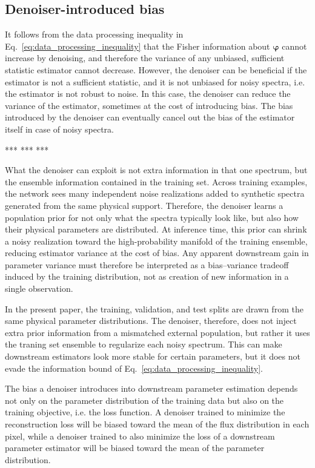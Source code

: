 \documentclass[twocolumn]{aastex7}
\newcommand{\m}[1]{\boldsymbol{#1}}
\begin{document}
\subsection{Denoiser-introduced bias}

It follows from the data processing inequality in Eq.~\ref{eq:data_processing_inequality} that the Fisher information about $\m{\varphi}$ cannot increase by denoising, and therefore the variance of any unbiased, sufficient statistic estimator cannot decrease. However, the denoiser can be beneficial if the estimator is not a sufficient statistic, and it is not unbiased for noisy spectra, i.e. the estimator is not robust to noise. In this case, the denoiser can reduce the variance of the estimator, sometimes at the cost of introducing bias. The bias introduced by the denoiser can eventually cancel out the bias of the estimator itself in case of noisy spectra.

*** *** *** 

What the denoiser can exploit is not extra information in that one spectrum, but the ensemble information contained in the training set. Across training examples, the network sees many independent noise realizations added to synthetic spectra generated from the same physical support. Therefore, the denoiser learns a population prior for not only what the spectra typically look like, but also how their physical parameters are distributed. At inference time, this prior can shrink a noisy realization toward the high-probability manifold of the training ensemble, reducing estimator variance at the cost of bias. Any apparent downstream gain in parameter variance must therefore be interpreted as a bias--variance tradeoff induced by the training distribution, not as creation of new information in a single observation.

In the present paper, the training, validation, and test splits are drawn from the same physical parameter distributions. The denoiser, therefore, does not inject extra prior information from a mismatched external population, but rather it uses the traning set ensemble to regularize each noisy spectrum. This can make downstream estimators look more stable for certain parameters, but it does not evade the information bound of Eq.~\ref{eq:data_processing_inequality}. 

The bias a denoiser introduces into downstream parameter estimation depends not only on the parameter distribution of the training data but also on the training objective, i.e. the loss function. A denoiser trained to minimize the reconstruction loss will be biased toward the mean of the flux distribution in each pixel, while a denoiser trained to also minimize the loss of a downstream parameter estimator will be biased toward the mean of the parameter distribution.
\end{document}
